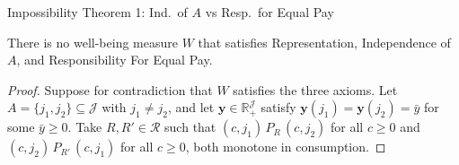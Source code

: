 \documentclass[10pt]{beamer}
\begin{document}
\begin{frame}[allowframebreaks]{Impossibility Theorem 1: Ind.\ of $A$ vs Resp.\ for Equal Pay}
\hypertarget{imp:thm1}{}%
\hyperlink{tab:classification}{}

\scriptsize
\begin{theorem}
There is no well-being measure $W$ that satisfies Representation, Independence
of $A$, and Responsibility For Equal Pay.
\end{theorem}
\framebreak
\begin{proof}
Suppose for contradiction that $W$ satisfies the three axioms. Let
$A=\{j_1,j_2\}\subseteq\mathcal J$ with $j_1\neq j_2$, and let
$\mathbf y\in\mathbb R_+^{\mathcal J}$ satisfy $\mathbf y(j_1)=\mathbf
y(j_2)=\bar y$ for some $\bar y\geq 0$. Take $R,R'\in\mathcal R$ such that
$(c,j_1)\,P_R\,(c,j_2)$ for all $c\geq 0$ and $(c,j_2)\,P_{R'}\,(c,j_1)$ for all
$c\geq 0$, both monotone in consumption.


\end{proof}
\end{frame}
\end{document}
